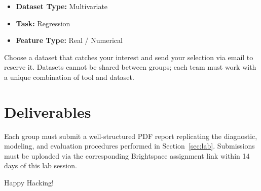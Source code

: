 \documentclass{article}
\begin{document}
\begin{itemize}
  \item \textbf{Dataset Type:} Multivariate
  \item \textbf{Task:} Regression
  \item \textbf{Feature Type:} Real / Numerical
\end{itemize}

Choose a dataset that catches your interest and send your selection via email to reserve it. Datasets cannot be shared between groups; each team must work with a unique combination of tool and dataset.

\section{Deliverables}
Each group must submit a well-structured PDF report replicating the diagnostic, modeling, and evaluation procedures performed in Section~\ref{sec:lab}. Submissions must be uploaded via the corresponding Brightspace\texttrademark{} assignment link within 14 days of this lab session.

\vspace{5mm}
Happy Hacking! 
\end{document}
